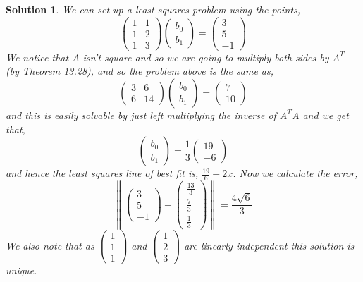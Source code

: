 \documentclass{article}
\newtheorem{solution}{Solution}
\begin{document}
\begin{solution}
  We can set up a least squares problem using the points,
  $$ \begin{pmatrix}
    1 & 1 \\
    1 & 2 \\
    1 & 3
  \end{pmatrix} \begin{pmatrix}
    b_0 \\ b_1
  \end{pmatrix} = \begin{pmatrix}
    3 \\ 5 \\ -1
  \end{pmatrix}$$
  We notice that $A$ isn't square and so we are going to multiply both sides by $A^T$ (by Theorem 13.28), and so the problem above is the same as,
  $$ \begin{pmatrix}
    3 & 6 \\ 6 & 14
  \end{pmatrix} \begin{pmatrix}
    b_0 \\ b_1
  \end{pmatrix} = \begin{pmatrix}
    7 \\ 10
  \end{pmatrix}$$
  and this is easily solvable by just left multiplying the inverse of $A^TA$ and we get that,
  $$ \begin{pmatrix}
    b_0 \\ b_1
  \end{pmatrix} = \frac{1}{3}\begin{pmatrix}
    19 \\ -6
  \end{pmatrix} $$
  and hence the least squares line of best fit is, $\displaystyle{\frac{19}{6} - 2x}$. Now we calculate the error,
  $$ \left\| \begin{pmatrix}
    3 \\ 5 \\ -1
  \end{pmatrix} - \begin{pmatrix}
    \frac{13}{3} \\ \frac{7}{3} \\ \frac{1}{3}
  \end{pmatrix}\right\| = \frac{4\sqrt 6}{3}$$
  We also note that as $\displaystyle{\begin{pmatrix}
    1 \\ 1 \\ 1
  \end{pmatrix}}$ and $\displaystyle{\begin{pmatrix}
    1 \\ 2 \\ 3
  \end{pmatrix}}$ are linearly independent this solution is unique.\\


\end{solution}
\end{document}
